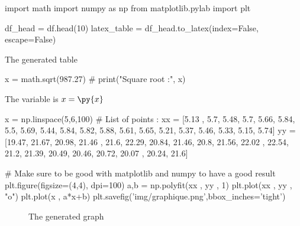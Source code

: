 \documentclass[11pt]{article}%
\begin{document}
\begin{pycode}
import math
import numpy as np
from matplotlib.pylab import plt    
\end{pycode}


\begin{pycode}
df_head = df.head(10)
latex_table = df_head.to_latex(index=False, escape=False)
\end{pycode}
    
\begin{table}
\centering
{}
\caption{The generated table}
\end{table}


\begin{pycode}
x = math.sqrt(987.27)
# print("Square root :",  x)
\end{pycode}

\vspace{5em}

The variable is $x=\py{x}$


\begin{pycode}
x = np.linspace(5,6,100)
# List of points :
xx = [5.13 , 5.7, 5.48, 5.7, 5.66, 5.84, 5.5, 5.69, 5.44, 5.84, 5.82, 5.88, 5.61, 5.65, 5.21, 5.37, 5.46, 5.33, 5.15, 5.74]
yy = [19.47, 21.67, 20.98, 21.46 , 21.6, 22.29, 20.84, 21.46, 20.8, 21.56, 22.02 , 22.54, 21.2, 21.39, 20.49, 20.46, 20.72, 20.07 , 20.24, 21.6]

# Make sure to be good with matplotlib and numpy to have a good result
plt.figure(figsize=(4,4), dpi=100)
a,b = np.polyfit(xx , yy , 1)
plt.plot(xx , yy , "o")
plt.plot(x , a*x+b)
plt.savefig('img/graphique.png',bbox_inches='tight')
\end{pycode}

\begin{figure}
    \caption{The generated graph}
\end{figure}
\end{document}
